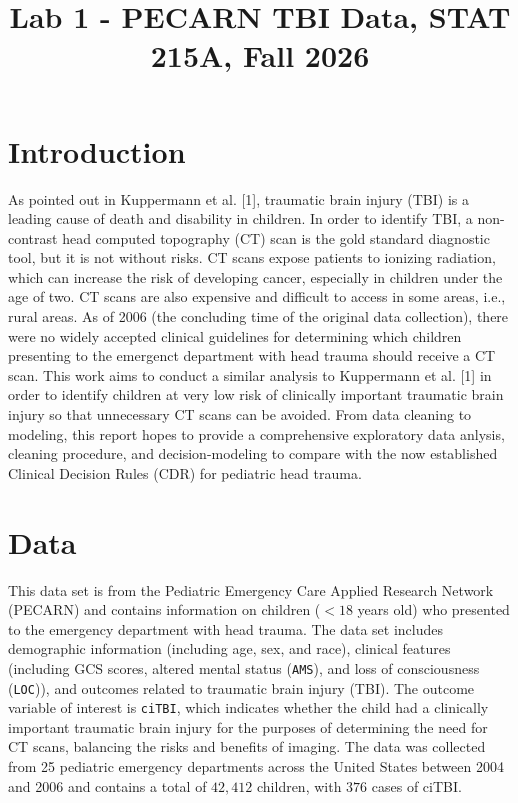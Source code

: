 \documentclass[10pt,letterpaper]{article}
\title{Lab 1 - PECARN TBI Data, STAT 215A, Fall 2026}
\author{}
\begin{document}
\maketitle

\section{Introduction}\label{introduction}

As pointed out in Kuppermann et al. [1], traumatic brain injury (TBI) is a leading cause of death and disability in children. In order to identify TBI, a non-contrast head computed topography (CT) scan is the gold standard diagnostic tool, but it is not without risks. CT scans expose patients to ionizing radiation, which can increase the risk of developing cancer, especially in children under the age of two. CT scans are also expensive and difficult to access in some areas, i.e., rural areas. As of 2006 (the concluding time of the original data collection), there were no widely accepted clinical guidelines for determining which children presenting to the emergenct department with head trauma should receive a CT scan. This work aims to conduct a similar analysis to Kuppermann et al. [1] in order to identify children at very low risk of clinically important traumatic brain injury so that unnecessary CT scans can be avoided. From data cleaning to modeling, this report hopes to provide a comprehensive exploratory data anlysis, cleaning procedure, and decision-modeling to compare with the now established Clinical Decision Rules (CDR) for pediatric head trauma.

\section{Data}\label{data}

This data set is from the Pediatric Emergency Care Applied Research Network (PECARN) and contains information on children ($<18$ years old) who presented to the emergency department with head trauma. The data set includes demographic information (including age, sex, and race), clinical features (including GCS scores, altered mental status (\texttt{AMS}), and loss of consciousness (\texttt{LOC})), and outcomes related to traumatic brain injury (TBI). The outcome variable of interest is \texttt{ciTBI}, which indicates whether the child had a clinically important traumatic brain injury for the purposes of determining the need for CT scans, balancing the risks and benefits of imaging. The data was collected from 25 pediatric emergency departments across the United States between 2004 and 2006 and contains a total of $42,412$ children, with $376$ cases of ciTBI. 
\end{document}

